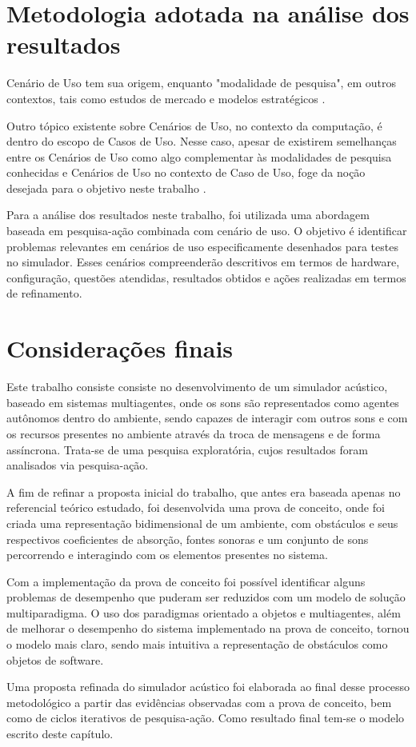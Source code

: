 \section{Metodologia adotada na análise dos resultados}

Cenário de Uso tem sua origem, enquanto "modalidade de pesquisa", em outros contextos, tais como estudos de mercado e modelos estratégicos \cite{tonicenarios}. 

Outro tópico existente sobre Cenários de Uso, no contexto da computação, é dentro do escopo de Casos de Uso. Nesse caso, apesar de existirem semelhanças entre os Cenários de Uso como algo complementar às modalidades de pesquisa conhecidas e Cenários de Uso no contexto de Caso de Uso, foge da noção desejada para o objetivo neste trabalho \cite{rezende}.

Para a análise dos resultados neste trabalho, foi utilizada uma abordagem baseada em pesquisa-ação combinada com cenário de uso. O objetivo é identificar  problemas relevantes  em cenários de uso especificamente desenhados para testes no simulador. Esses cenários compreenderão descritivos em termos de hardware, configuração, questões atendidas, resultados obtidos e ações realizadas em termos de refinamento.

\section{Considerações finais}

Este trabalho consiste consiste no desenvolvimento de um simulador acústico, baseado em sistemas multiagentes, onde os sons são representados como agentes autônomos dentro do ambiente, sendo capazes de interagir com outros sons e com os recursos presentes no ambiente através da troca de mensagens e de forma assíncrona. Trata-se de uma pesquisa exploratória, cujos resultados foram analisados via pesquisa-ação.

A fim de refinar a proposta inicial do trabalho, que antes era baseada apenas no referencial teórico estudado, foi desenvolvida uma prova de conceito, onde foi criada uma representação bidimensional de um ambiente, com obstáculos e seus respectivos coeficientes de absorção, fontes sonoras e um conjunto de sons percorrendo e interagindo com os elementos presentes no sistema.

Com a implementação da prova de conceito foi possível identificar alguns problemas de desempenho que puderam ser reduzidos com um modelo de solução multiparadigma. O uso dos paradigmas orientado a objetos e multiagentes, além de melhorar o desempenho do sistema implementado na prova de conceito, tornou o modelo mais claro, sendo mais intuitiva a representação de obstáculos como objetos de software.

Uma proposta refinada do simulador acústico foi elaborada ao final desse processo metodológico a partir das evidências observadas com a prova de conceito, bem como de ciclos iterativos de pesquisa-ação. Como resultado final tem-se o modelo escrito deste capítulo.